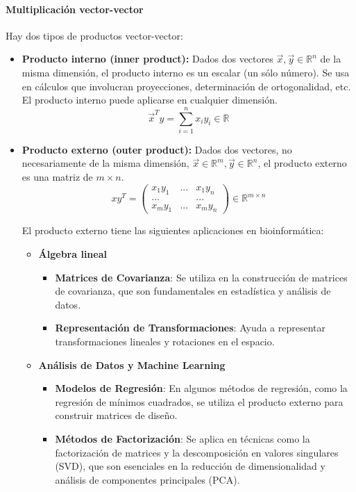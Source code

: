 \paragraph{Multiplicación vector-vector}
Hay dos tipos de productos vector-vector:
\begin{itemize}
\item \textbf{Producto interno (inner product):}
Dados dos vectores $\vec{x},\vec{y} \in \mathbb{R}^n$ de la misma dimensión, el producto interno es un escalar (un sólo número). Se usa en cálculos que involucran proyecciones, determinación de ortogonalidad, etc. El producto interno puede aplicarse en cualquier dimensión.
$$\vec{x}^T y = \sum^n_{i=1} x_iy_i \in \mathbb{R} $$

\item \textbf{Producto externo (outer product):}
Dados dos vectores, no necesariamente de la misma dimensión, $\vec{x} \in \mathbb{R}^m, \vec{y} \in \mathbb{R}^n$, el producto externo es una matriz de $m \times n$.
$$xy^T = \begin{pmatrix}
x_1 y_1 & ... & x_1 y_n \\
...  & & ... \\
x_m y_1 & ... & x_m y_n
\end{pmatrix} \in \mathbb{R}^{m \times n}$$

El producto externo tiene las siguientes aplicaciones en bioinformática:
\begin{itemize}
\item \textbf{Álgebra lineal}
\begin{itemize}
\item \textbf{Matrices de Covarianza}: Se utiliza en la construcción de matrices de covarianza, que son fundamentales en estadística y análisis de datos.
\item \textbf{Representación de Transformaciones}: Ayuda a representar transformaciones lineales y rotaciones en el espacio.
\end{itemize}
\item \textbf{Análisis de Datos y Machine Learning}
\begin{itemize}
\item \textbf{Modelos de Regresión}: En algunos métodos de regresión, como la regresión de mínimos cuadrados, se utiliza el producto externo para construir matrices de diseño.
\item \textbf{Métodos de Factorización}: Se aplica en técnicas como la factorización de matrices y la descomposición en valores singulares (SVD), que son esenciales en la reducción de dimensionalidad y análisis de componentes principales (PCA).
\end{itemize}
\end{itemize}
\end{itemize}

